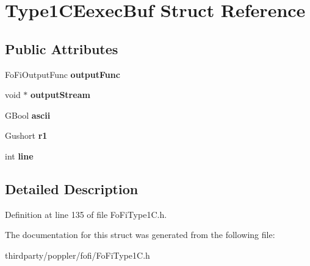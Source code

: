 \hypertarget{struct_type1_c_eexec_buf}{}\section{Type1\+C\+Eexec\+Buf Struct Reference}
\label{struct_type1_c_eexec_buf}
\subsection*{Public Attributes}
\begin{DoxyCompactItemize}
\item 
\mbox{\label{struct_type1_c_eexec_buf_ab83d75a3570d47075b7ed95a9ecc9c72}} 
Fo\+Fi\+Output\+Func {\bfseries output\+Func}
\item 
\mbox{\label{struct_type1_c_eexec_buf_ae3fd43c2b68f906d86aaaacf84a9151c}} 
void $\ast$ {\bfseries output\+Stream}
\item 
\mbox{\label{struct_type1_c_eexec_buf_ac59e04a8f17e4e283973a15d340a8ac4}} 
G\+Bool {\bfseries ascii}
\item 
\mbox{\label{struct_type1_c_eexec_buf_ad1f6c135ccd667a659395a29c5f3ab93}} 
Gushort {\bfseries r1}
\item 
\mbox{\label{struct_type1_c_eexec_buf_ab4a219ba8636c086f3559f2a4ab81432}} 
int {\bfseries line}
\end{DoxyCompactItemize}


\subsection{Detailed Description}


Definition at line 135 of file Fo\+Fi\+Type1\+C.\+h.



The documentation for this struct was generated from the following file\+:\begin{DoxyCompactItemize}
\item 
thirdparty/poppler/fofi/Fo\+Fi\+Type1\+C.\+h\end{DoxyCompactItemize}

